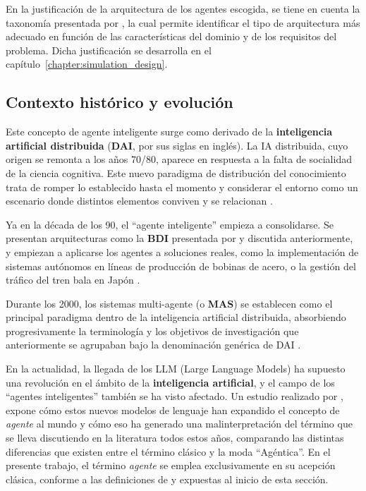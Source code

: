 En la justificación de la arquitectura de los agentes escogida, se tiene en cuenta la taxonomía presentada por \textcite{Wooldridge1995}, la cual permite identificar el tipo de arquitectura más adecuado en función de las características del dominio y de los requisitos del problema. Dicha justificación se desarrolla en el capítulo~\ref{chapter:simulation_design}.

\subsection{Contexto histórico y evolución}

Este concepto de agente inteligente surge como derivado de la \textbf{inteligencia artificial distribuida} (\textbf{DAI}, por sus siglas en inglés). La IA distribuida, cuyo origen se remonta a los años 70/80, aparece en respuesta a la falta de socialidad de la ciencia cognitiva. Este nuevo paradigma de distribución del conocimiento trata de romper lo establecido hasta el momento y considerar el entorno como un escenario donde distintos elementos conviven y se relacionan \cite{werner1996logical}. 

Ya en la década de los 90, el \enquote{agente inteligente} empieza a consolidarse. Se presentan arquitecturas como la \textbf{BDI} presentada por \textcite{bratman1987intention} y discutida anteriormente, y empiezan a aplicarse los agentes a soluciones reales, como la implementación de sistemas autónomos en líneas de producción de bobinas de acero, o la gestión del tráfico del tren bala en Japón \cite{parunak1996applications}.

Durante los 2000, los sistemas multi-agente (o \textbf{MAS}) se establecen como el principal paradigma dentro de la inteligencia artificial distribuida, absorbiendo progresivamente la terminología y los objetivos de investigación que anteriormente se agrupaban bajo la denominación genérica de DAI \cite{wooldridge2009introduction}.

En la actualidad, la llegada de los LLM (Large Language Models) ha supuesto una revolución en el ámbito de la \textbf{inteligencia artificial}, y el campo de los \enquote{agentes inteligentes} también se ha visto afectado. Un estudio realizado por \textcite{botti2025agentic}, expone cómo estos nuevos modelos de lenguaje han expandido el concepto de \textit{agente} al mundo y cómo eso ha generado una malinterpretación del término que se lleva discutiendo en la literatura todos estos años, comparando las distintas diferencias que existen entre el término clásico y la moda \enquote{Agéntica}. En el presente trabajo, el término \textit{agente} se emplea exclusivamente en su acepción clásica, conforme a las definiciones de \textcite{maes1993modeling} y \textcite{jennings1998applications} expuestas al inicio de esta sección.



